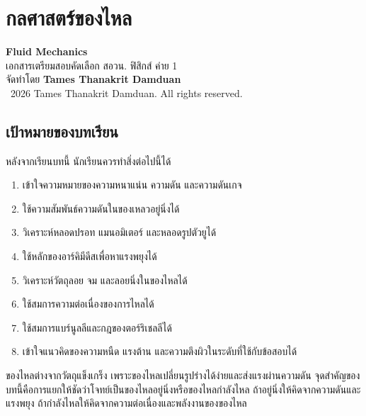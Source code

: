 
\chapter{กลศาสตร์ของไหล}

\begin{center}
    {\Large \textbf{Fluid Mechanics}}\\[4pt]
    {\normalsize เอกสารเตรียมสอบคัดเลือก สอวน. ฟิสิกส์ ค่าย 1}\\[6pt]
    {\normalsize จัดทำโดย \textbf{Tames Thanakrit Damduan}}\\[2pt]
    {\footnotesize \textcopyright\ 2026 Tames Thanakrit Damduan. All rights reserved.}\\[8pt]
\end{center}

\section*{เป้าหมายของบทเรียน}

หลังจากเรียนบทนี้ นักเรียนควรทำสิ่งต่อไปนี้ได้

\begin{enumerate}
    \item เข้าใจความหมายของความหนาแน่น ความดัน และความดันเกจ
    \item ใช้ความสัมพันธ์ความดันในของเหลวอยู่นิ่งได้
    \item วิเคราะห์หลอดปรอท แมนอมิเตอร์ และหลอดรูปตัวยูได้
    \item ใช้หลักของอาร์คิมีดีสเพื่อหาแรงพยุงได้
    \item วิเคราะห์วัตถุลอย จม และลอยนิ่งในของไหลได้
    \item ใช้สมการความต่อเนื่องของการไหลได้
    \item ใช้สมการแบร์นูลลีและกฎของตอร์ริเชลลีได้
    \item เข้าใจแนวคิดของความหนืด แรงต้าน และความตึงผิวในระดับที่ใช้กับข้อสอบได้
\end{enumerate}

\begin{tcolorbox}[title=แนวคิดสำคัญของบทนี้]
ของไหลต่างจากวัตถุแข็งเกร็ง เพราะของไหลเปลี่ยนรูปร่างได้ง่ายและส่งแรงผ่านความดัน จุดสำคัญของบทนี้คือการแยกให้ชัดว่าโจทย์เป็นของไหลอยู่นิ่งหรือของไหลกำลังไหล ถ้าอยู่นิ่งให้คิดจากความดันและแรงพยุง ถ้ากำลังไหลให้คิดจากความต่อเนื่องและพลังงานของของไหล
\end{tcolorbox}

